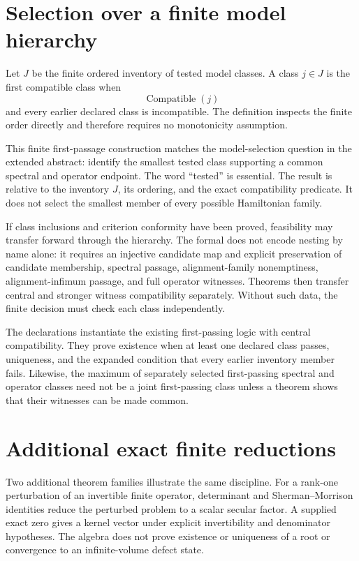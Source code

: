 \section{Selection over a finite model hierarchy}

Let $J$ be the finite ordered inventory of tested model classes.  A class $j\in J$ is
the first compatible class when
\[
  \operatorname{Compatible}(j)
\]
and every earlier declared class is incompatible.  The definition inspects the finite
order directly and therefore requires no monotonicity assumption.

This finite first-passage construction matches the model-selection question in the
extended abstract: identify the smallest tested class supporting a common spectral and
operator endpoint.  The word ``tested'' is essential.  The result is relative to the
inventory $J$, its ordering, and the exact compatibility predicate.  It does not select
the smallest member of every possible Hamiltonian family.

If class inclusions and criterion conformity have been proved, feasibility may transfer
forward through the hierarchy.  The formal
 does not encode nesting by name alone: it requires an
injective candidate map and explicit preservation of candidate membership, spectral
passage, alignment-family nonemptiness, alignment-infimum passage, and full operator
witnesses.  Theorems  then transfer central and stronger
witness compatibility separately.  Without such data, the finite decision must check
each class independently.

The declarations  instantiate the existing first-passing
logic with central compatibility.  They prove existence when at least one declared class
passes, uniqueness, and the expanded condition that every earlier inventory member
fails.  Likewise, the maximum of separately selected first-passing spectral and
operator classes need not be a joint first-passing class unless a theorem shows that
their witnesses can be made common.

\section{Additional exact finite reductions}

Two additional theorem families illustrate the same discipline.  For a rank-one
perturbation of an invertible finite operator, determinant and Sherman--Morrison
identities reduce the perturbed problem to a scalar secular factor.  A supplied exact
zero gives a kernel vector under explicit invertibility and denominator hypotheses.
The algebra does not prove existence or uniqueness of a root or convergence to an
infinite-volume defect state.


